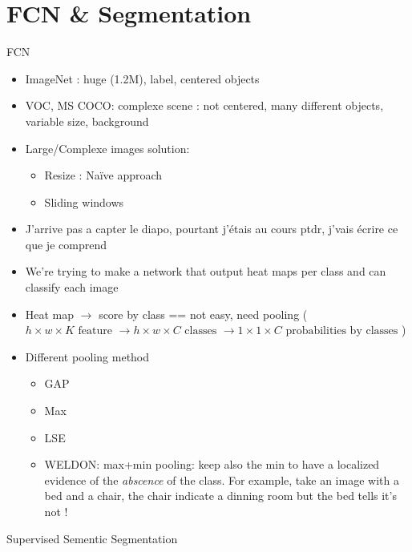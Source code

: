 \documentclass{article}
\theoremstyle{plain}%
\theoremstyle{definition}
\theoremstyle{remark}
\begin{document}
\section{FCN \& Segmentation}
FCN
\begin{itemize}
    \item ImageNet : huge (1.2M), label, centered objects
    \item VOC, MS COCO: complexe scene : not centered, many different objects, variable size, background 
    \item Large/Complexe images solution: \begin{itemize}
        \item Resize : Naïve approach
        \item Sliding windows 
    \end{itemize}
    \item J'arrive pas a capter le diapo, pourtant j'étais au cours ptdr, j'vais écrire ce que je comprend
    \item We're trying to make a network that output heat maps per class and can classify each image
    \item Heat map $\rightarrow$ score by class == not easy, need pooling ($ h \times w \times K \text{ feature } \rightarrow h \times w \times C \text{ classes } \rightarrow 1 \times 1 \times C \text{ probabilities by classes}$ )
    \item Different pooling method \begin{itemize}
        \item GAP
        \item Max 
        \item LSE 
        \item WELDON: max+min pooling: keep also the min to have a localized evidence of the \textit{abscence} of the class. For example, take an image with a bed and a chair, the chair indicate a dinning room but the bed tells it's not !
    \end{itemize}
\end{itemize}
Supervised Sementic Segmentation
\end{document}

